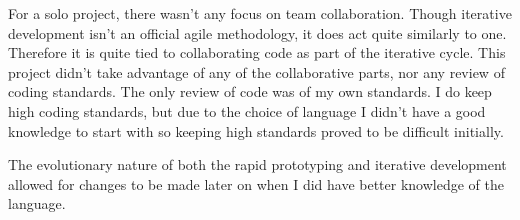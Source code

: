 For a solo project, there wasn't any focus on team collaboration. Though iterative development 
isn't an official agile methodology, it does act quite similarly to one. Therefore it is quite 
tied to collaborating code as part of the iterative cycle. This project didn't take advantage of
any of the collaborative parts, nor any review of coding standards. The only review of code was
of my own standards. I do keep high coding standards, but due to the choice of language I didn't
have a good knowledge to start with so keeping high standards proved to be difficult initially.

The evolutionary nature of both the rapid prototyping and iterative development allowed for 
changes to be made later on when I did have better knowledge of the language. 

